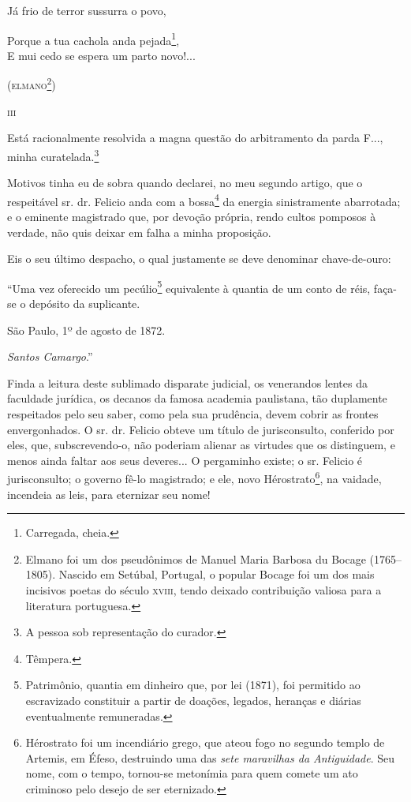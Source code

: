 \asterisc{}

Já frio de terror sussurra o povo,

Porque a tua cachola anda pejada\footnote{ Carregada, cheia.},\\
E mui cedo se espera um parto novo!...

(\textsc{elmano}\footnote{ Elmano foi um dos pseudônimos de Manuel Maria Barbosa
  du Bocage (1765--1805). Nascido em Setúbal, Portugal, o popular Bocage
  foi um dos mais incisivos poetas do século \textsc{xviii}, tendo deixado
  contribuição valiosa para a literatura portuguesa.})

\textsc{iii}

Está racionalmente resolvida a magna questão do arbitramento da parda
F..., minha curatelada.\footnote{ A pessoa sob representação do
  curador.}

Motivos tinha eu de sobra quando declarei, no meu segundo artigo, que o
respeitável sr. dr. Felicio anda com a bossa\footnote{ Têmpera.} da
energia sinistramente abarrotada; e o eminente magistrado que, por
devoção própria, rendo cultos pomposos à verdade, não quis deixar em
falha a minha proposição.

Eis o seu último despacho, o qual justamente se deve denominar
chave-de-ouro:

``Uma vez oferecido um pecúlio\footnote{ Patrimônio, quantia em dinheiro
  que, por lei (1871), foi permitido ao escravizado constituir a partir
  de doações, legados, heranças e diárias eventualmente remuneradas.}
equivalente à quantia de um conto de réis, faça-se o depósito da
suplicante.

São Paulo, 1º de agosto de 1872.

\emph{Santos Camargo}.''

Finda a leitura deste sublimado disparate judicial, os venerandos lentes
da faculdade jurídica, os decanos da famosa academia paulistana, tão
duplamente respeitados pelo seu saber, como pela sua prudência, devem
cobrir as frontes envergonhados. O sr. dr. Felicio obteve um título de
jurisconsulto, conferido por eles, que, subscrevendo-o, não poderiam
alienar as virtudes que os distinguem, e menos ainda faltar aos seus
deveres... O pergaminho existe; o sr. Felicio é jurisconsulto; o governo
fê-lo magistrado; e ele, novo Hérostrato\footnote{ Hérostrato foi um
  incendiário grego, que ateou fogo no segundo templo de Artemis, em
  Éfeso, destruindo uma das \emph{sete maravilhas da Antiguidade}. Seu
  nome, com o tempo, tornou-se metonímia para quem comete um ato
  criminoso pelo desejo de ser eternizado.}, na vaidade, incendeia as
leis, para eternizar seu nome!

